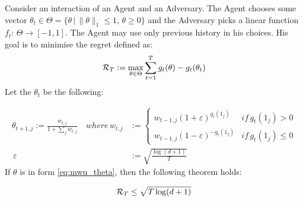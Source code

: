 Consider an interaction of an Agent and an Adversary. The Agent chooses some vector $\theta_t \in \Theta =  \{\theta \, | \, \|\theta\|_1 \leq 1, \, \theta \geq 0\}$ and the Adversary picks a linear function $f_t: \, \Theta \to [-1, 1]$. The Agent may use only previous history in his choices. His goal is to minimise the regret defined as: 
    \[
        \operatorname{\mathcal{R}}_{T} := \max_{\theta \in \Theta} \sum_{t = 1}^T g_t(\theta) - g_t(\theta_t)
    \]
    Let the $\theta_t$ be the following:
    
    \begin{equation}
        \label{eq:mwu_theta}
        \begin{split}
            \theta_{t+1, j} := \frac{w_{t, j}}{1 + \sum_{j}w_{t,j}}\quad where  \, w_{t, j} &:= \begin{cases}
                    w_{t-1, j}(1 + \varepsilon)^{g_t(1_j)} & if\, g_t(1_j) > 0 \\
                    w_{t-1, j}(1 - \varepsilon)^{-g_t(1_j)} & if\, g_t(1_j) \leq 0
                    \end{cases}\\
             \, \varepsilon &:= \sqrt{\frac{\log(d+1)}{T}}
        \end{split}
    \end{equation}
    If $\theta$ is in form \ref{eq:mwu_theta}, then the following  theorem holds:
    
\begin{theorem}
    \[
        \operatorname{\mathcal{R}}_T \leq  \sqrt{T\log(d+1)}
    \]
\end{theorem}

